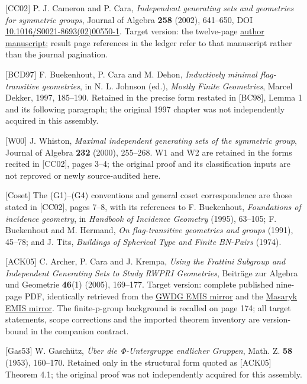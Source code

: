 \documentclass[
  10pt,
  letterpaper,
]{article}
\begin{document}
{[}CC02{]} P. J. Cameron and P. Cara, \emph{Independent generating sets
and geometries for symmetric groups}, Journal of Algebra \textbf{258}
(2002), 641--650, DOI
\href{https://doi.org/10.1016/S0021-8693(02)00550-1}{10.1016/S0021-8693(02)00550-1}.
Target version: the twelve-page
\href{https://maths.qmul.ac.uk/~pjc/preprints/igsgsn.pdf}{author
manuscript}; result page references in the ledger refer to that
manuscript rather than the journal pagination.

{[}BCD97{]} F. Buekenhout, P. Cara and M. Dehon, \emph{Inductively
minimal flag-transitive geometries}, in N. L. Johnson (ed.),
\emph{Mostly Finite Geometries}, Marcel Dekker, 1997, 185--190. Retained
in the precise form restated in {[}BC98{]}, Lemma 1 and its following
paragraph; the original 1997 chapter was not independently acquired in
this assembly.

{[}W00{]} J. Whiston, \emph{Maximal independent generating sets of the
symmetric group}, Journal of Algebra \textbf{232} (2000), 255--268. W1
and W2 are retained in the forms recited in {[}CC02{]}, pages 3--4; the
original proof and its classification inputs are not reproved or newly
source-audited here.

{[}Coset{]} The (G1)--(G4) conventions and general coset correspondence
are those stated in {[}CC02{]}, pages 7--8, with its references to F.
Buekenhout, \emph{Foundations of incidence geometry}, in \emph{Handbook
of Incidence Geometry} (1995), 63--105; F. Buekenhout and M. Hermand,
\emph{On flag-transitive geometries and groups} (1991), 45--78; and J.
Tits, \emph{Buildings of Spherical Type and Finite BN-Pairs} (1974).

{[}ACK05{]} C. Archer, P. Cara and J. Krempa, \emph{Using the Frattini
Subgroup and Independent Generating Sets to Study RWPRI Geometries},
Beiträge zur Algebra und Geometrie \textbf{46}(1) (2005), 169--177.
Target version: complete published nine-page PDF, identically retrieved
from the
\href{https://ftp.gwdg.de/pub/EMIS/journals/BAG/vol.46/no.1/b46h1car.pdf}{GWDG
EMIS mirror} and the
\href{https://emis.muni.cz/journals/BAG/vol.46/no.1/b46h1car.pdf}{Masaryk
EMIS mirror}. The finite-p-group background is recalled on page 174; all
target statements, scope corrections and the imported theorem inventory
are version-bound in the companion contract.

{[}Gas53{]} W. Gaschütz, \emph{Über die Φ-Untergruppe endlicher
Gruppen}, Math. Z. \textbf{58} (1953), 160--170. Retained only in the
structural form quoted as {[}ACK05{]} Theorem 4.1; the original proof
was not independently acquired for this assembly.
\end{document}
